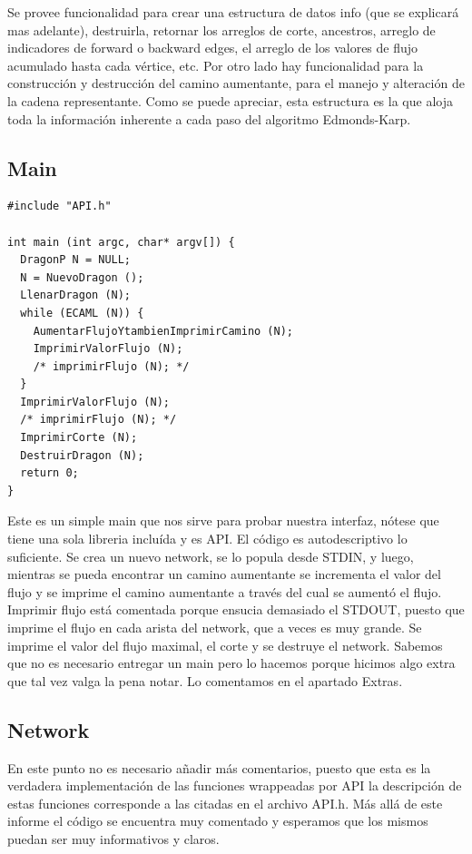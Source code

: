 \documentclass[11pt]{article}
\begin{document}
Se provee funcionalidad para crear una estructura de datos info (que
se explicará mas adelante), destruirla, retornar los arreglos de
corte, ancestros, arreglo de indicadores de forward o backward edges,
el arreglo de los valores de flujo acumulado hasta cada vértice, etc.
Por otro lado hay funcionalidad para la construcción y destrucción
del camino aumentante, para el manejo y alteración de la cadena
representante.
Como se puede apreciar, esta estructura es la que aloja toda la
información inherente a cada paso del algoritmo Edmonds-Karp.
\subsection{Main}
\label{sec-4-5}


\begin{verbatim}
#include "API.h"

int main (int argc, char* argv[]) {
  DragonP N = NULL;
  N = NuevoDragon ();
  LlenarDragon (N);
  while (ECAML (N)) {
    AumentarFlujoYtambienImprimirCamino (N);
    ImprimirValorFlujo (N);
    /* imprimirFlujo (N); */
  }
  ImprimirValorFlujo (N);
  /* imprimirFlujo (N); */
  ImprimirCorte (N);
  DestruirDragon (N);
  return 0;
}
\end{verbatim}
Este es un simple main que nos sirve para probar nuestra interfaz,
nótese que tiene una sola libreria incluída y es API. El código es
autodescriptivo lo suficiente. Se crea un nuevo network, se lo popula
desde STDIN, y luego, mientras se pueda encontrar un camino
aumentante se incrementa el valor del flujo y se imprime el camino
aumentante a través del cual se aumentó el flujo. Imprimir flujo está
comentada porque ensucia demasiado el STDOUT, puesto que imprime el
flujo en cada arista del network, que a veces es muy grande. Se
imprime el valor del flujo maximal, el corte y se destruye el network.
Sabemos que no es necesario entregar un main pero lo hacemos porque
hicimos algo extra que tal vez valga la pena notar. Lo comentamos en
el apartado Extras.
\subsection{Network}
\label{sec-4-6}

En este punto no es necesario añadir más comentarios, puesto que esta
es la verdadera implementación de las funciones wrappeadas por API la
descripción de estas funciones corresponde a las citadas en el
archivo API.h.
Más allá de este informe el código se encuentra muy comentado y
esperamos que los mismos puedan ser muy informativos y claros.
\end{document}
